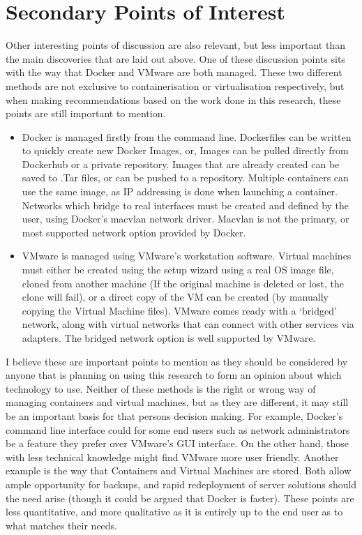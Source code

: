 \section{Secondary Points of Interest}
Other interesting points of discussion are also relevant, but less important than the main discoveries that are laid out above. One of these discussion points sits with the way that Docker and VMware are both managed. These two different methods are not exclusive to containerisation or virtualisation respectively, but when making recommendations based on the work done in this research, these points are still important to mention.
\begin{itemize}
  \item Docker is managed firstly from the command line. Dockerfiles can be written to quickly create new Docker Images, or, Images can be pulled directly from Dockerhub or a private repository. Images that are already created can be saved to .Tar files, or can be pushed to a repository. Multiple containers can use the same image, as IP addressing is done when launching a container. Networks which bridge to real interfaces must be created and defined by the user, using Docker's macvlan network driver. Macvlan is not the primary, or most supported network option provided by Docker.
  \item VMware is managed using VMware's workstation software. Virtual machines must either be created using the setup wizard using a real OS image file, cloned from another machine (If the original machine is deleted or lost, the clone will fail), or a direct copy of the VM can be created (by manually copying the Virtual Machine files). VMware comes ready with a `bridged' network, along with virtual networks that can connect with other services via adapters. The bridged network option is well supported by VMware.
\end{itemize}

I believe these are important points to mention as they should be considered by anyone that is planning on using this research to form an opinion about which technology to use. Neither of these methods is the right or wrong way of managing containers and virtual machines, but as they are different, it may still be an important basis for that persons decision making. For example, Docker's command line interface could for some end users such as network administrators be a feature they prefer over VMware's GUI interface. On the other hand, those with less technical knowledge might find VMware more user friendly. Another example is the way that Containers and Virtual Machines are stored. Both allow ample opportunity for backups, and rapid redeployment of server solutions should the need arise (though it could be argued that Docker is faster). These points are less quantitative, and more qualitative as it is entirely up to the end user as to what matches their needs.

